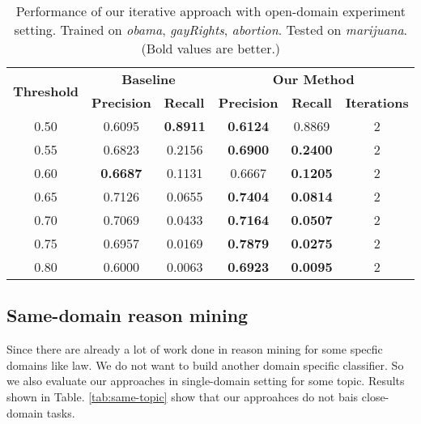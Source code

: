 \documentclass[11pt,a4paper]{article}
\begin{document}
\begin{table*}[h]
\begin{center}
\begin{tabular}{|c||c|c|c|c|c|}
\hline
\multicolumn{1}{|c|}{\multirow{2}{*}{\bf Threshold}} & \multicolumn{2}{c|}{\bf Baseline}  & \multicolumn{3}{c|}{\bf Our Method}    \\ \cline{2-6} 
\multicolumn{1}{|c|}{}   & \multicolumn{1}{l|}{\bf Precision} & \multicolumn{1}{l|}{\bf Recall} & \multicolumn{1}{l|}{\bf Precision} & \multicolumn{1}{c|}{\bf Recall} & \multicolumn{1}{l|}{\bf Iterations} \\ \hline
 \hline
0.50 & 0.6095 &\bf 0.8911 &\bf 0.6124 & 0.8869 & 2 \\
0.55 & 0.6823 & 0.2156 &\bf 0.6900 &\bf 0.2400 & 2 \\
0.60 &\bf 0.6687 & 0.1131 & 0.6667 &\bf 0.1205 & 2 \\
0.65 & 0.7126 & 0.0655 &\bf 0.7404 &\bf 0.0814 & 2 \\
0.70 & 0.7069 & 0.0433 &\bf 0.7164 &\bf 0.0507 & 2 \\
0.75 & 0.6957 & 0.0169 &\bf 0.7879 &\bf 0.0275 & 2 \\
0.80 & 0.6000 & 0.0063 &\bf 0.6923 &\bf 0.0095 & 2
\\\hline
\end{tabular}
\end{center}
\caption{\label{tab:cross-marijuana} Performance of our iterative approach with open-domain experiment setting. Trained on {\it obama}, {\it gayRights}, {\it abortion}. Tested on {\it marijuana}. (Bold values are better.)}
\end{table*}


\subsection{Same-domain reason mining}

Since there are already a lot of work done in reason mining for some specfic domains like law\cite{palau2009argumentation}. We do not want to build another domain specific classifier. So we also evaluate our approaches in single-domain setting for some topic. Results shown in Table. \ref{tab:same-topic} show that our approahces do not bais close-domain tasks. 
\end{document}
